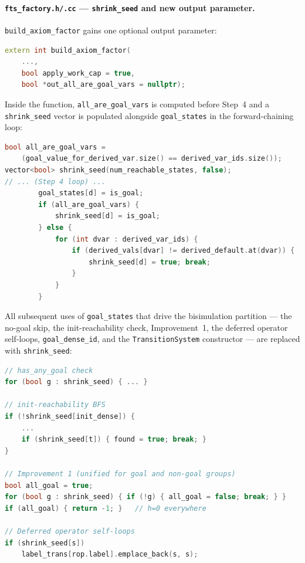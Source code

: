 \documentclass[11pt,a4paper]{article}
\begin{document}
\begin{enumerate}
    \paragraph{\texttt{fts\_factory.h/.cc} --- \texttt{shrink\_seed} and new output parameter.}

    \texttt{build\_axiom\_factor} gains one optional output parameter:
    \begin{lstlisting}[language=C++]
extern int build_axiom_factor(
    ...,
    bool apply_work_cap = true,
    bool *out_all_are_goal_vars = nullptr);
    \end{lstlisting}

    Inside the function, \texttt{all\_are\_goal\_vars} is computed before
    Step~4 and a \texttt{shrink\_seed} vector is populated alongside
    \texttt{goal\_states} in the forward-chaining loop:

    \begin{lstlisting}[language=C++]
bool all_are_goal_vars =
    (goal_value_for_derived_var.size() == derived_var_ids.size());
vector<bool> shrink_seed(num_reachable_states, false);
// ... (Step 4 loop) ...
        goal_states[d] = is_goal;
        if (all_are_goal_vars) {
            shrink_seed[d] = is_goal;
        } else {
            for (int dvar : derived_var_ids) {
                if (derived_vals[dvar] != derived_default.at(dvar)) {
                    shrink_seed[d] = true; break;
                }
            }
        }
    \end{lstlisting}

    All subsequent uses of \texttt{goal\_states} that drive the bisimulation
    partition --- the no-goal skip, the init-reachability check, Improvement~1,
    the deferred operator self-loops, \texttt{goal\_dense\_id}, and the
    \texttt{TransitionSystem} constructor --- are replaced with
    \texttt{shrink\_seed}:

    \begin{lstlisting}[language=C++]
// has_any_goal check
for (bool g : shrink_seed) { ... }

// init-reachability BFS
if (!shrink_seed[init_dense]) {
    ...
    if (shrink_seed[t]) { found = true; break; }
}

// Improvement 1 (unified for goal and non-goal groups)
bool all_goal = true;
for (bool g : shrink_seed) { if (!g) { all_goal = false; break; } }
if (all_goal) { return -1; }   // h=0 everywhere

// Deferred operator self-loops
if (shrink_seed[s])
    label_trans[rop.label].emplace_back(s, s);


\end{lstlisting}
\end{enumerate}
\end{document}
